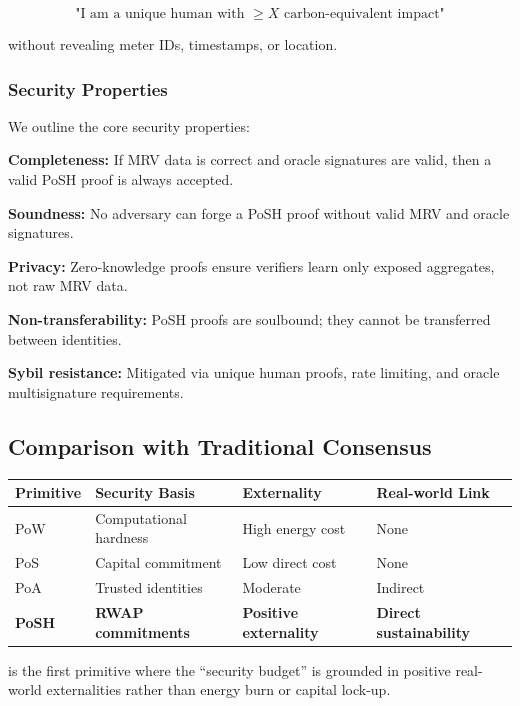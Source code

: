 \documentclass{article}
\begin{document}
\begin{equation}
\text{"I am a unique human with } \geq X \text{ carbon-equivalent impact"}
\end{equation}

without revealing meter IDs, timestamps, or location.

\subsubsection{Security Properties}

We outline the core security properties:

\textbf{Completeness:} If MRV data is correct and oracle signatures are valid, then a valid PoSH proof is always accepted.

\textbf{Soundness:} No adversary can forge a PoSH proof without valid MRV and oracle signatures.

\textbf{Privacy:} Zero-knowledge proofs ensure verifiers learn only exposed aggregates, not raw MRV data.

\textbf{Non-transferability:} PoSH proofs are soulbound; they cannot be transferred between identities.

\textbf{Sybil resistance:} Mitigated via unique human proofs, rate limiting, and oracle multisignature requirements.

\subsection{Comparison with Traditional Consensus}

\bigskip\noindent
\begin{tabular}{p{}p{}p{}p{}}
\toprule
Primitive & Security Basis & Externality & Real-world Link \\
\hline
PoW & Computational hardness & High energy cost & None \\
PoS & Capital commitment & Low direct cost & None \\
PoA & Trusted identities & Moderate & Indirect \\
\textbf{PoSH} & \textbf{RWAP commitments} & \textbf{Positive externality} & \textbf{Direct sustainability} \\
\bottomrule
\end{tabular}

\bigskipPoSH is the first primitive where the ``security budget'' is grounded in positive real-world externalities rather than energy burn or capital lock-up.
\end{document}
